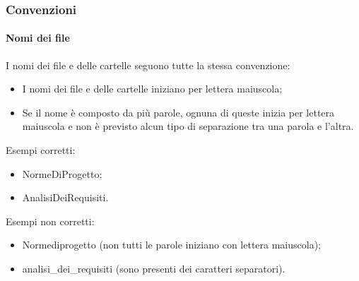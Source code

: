 \subsubsection{Convenzioni}

\paragraph{Nomi dei file}
I nomi dei file e delle cartelle seguono tutte la stessa convenzione:

\begin{itemize}

	\item I nomi dei file e delle cartelle iniziano per lettera maiuscola;
	
	\item Se il nome è composto da più parole, ognuna di queste inizia per lettera maiuscola e non è previsto alcun tipo di separazione tra una parola e l'altra.
	
\end{itemize}

Esempi corretti:

\begin{itemize}

	\item NormeDiProgetto;
	
	\item AnalisiDeiRequisiti.
	
\end{itemize}

Esempi non corretti:

\begin{itemize}

	\item Normediprogetto (non tutti le parole iniziano con lettera maiuscola);
	
	\item analisi\_dei\_requisiti (sono presenti dei caratteri separatori).
\end{itemize}

